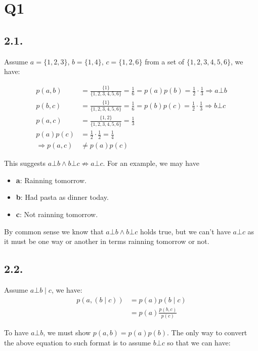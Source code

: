 \documentclass[11pt]{article}
\begin{document}
\section*{Q1}
\subsection*{2.1.}

Assume $a = \{1, 2, 3 \}$, $b = \{1, 4 \}$, $c = \{1, 2, 6 \}$ from a set of $\{1, 2, 3, 4, 5, 6\}$, we have:

\begin{align*}
    p(a, b) &= \frac{\{1\}}{\{1, 2, 3, 4, 5, 6\}} = \frac{1}{6} = p(a)p(b) = \frac{1}{2} \cdot \frac{1}{3} \Longrightarrow a \bot b \\
    p(b, c) &= \frac{\{1\}}{\{1, 2, 3, 4, 5, 6\}} = \frac{1}{6} = p(b)p(c) = \frac{1}{2} \cdot \frac{1}{3} \Longrightarrow b \bot c \\
    p(a, c) &= \frac{\{1, 2\}}{\{1, 2, 3, 4, 5, 6\}} = \frac{1}{3} \\
    p(a)p(c) &= \frac{1}{2}\cdot \frac{1}{2} = \frac{1}{4} \\
    \Longrightarrow p(a, c) &\neq p(a)p(c)
\end{align*}

This suggests $a \bot b \wedge b \bot c \not \Rightarrow a \bot c$. For an example, we may have

\begin{itemize}
    \item \textbf{a}: Rainning tomorrow.
    \item \textbf{b}: Had pasta as dinner today.
    \item \textbf{c}: Not rainning tomorrow.
\end{itemize}

By common sense we know that $a \bot b \wedge b \bot c$ holds true, but we can't have $a \bot c$ as it must be one way or another in terms rainning tomorrow or not.

\subsection*{2.2.}

Assume $a \bot b  \mid  c$, we have:
\begin{align*}
    p(a, (b  \mid  c)) &= p(a) p(b  \mid  c)\\
    &= p(a)\frac{p(b, c)}{p(c)}
\end{align*}

To have $a \bot b$, we must show $p(a, b) = p(a)p(b)$. The only way to convert the above equation to such format is to assume $b \bot c$ so that we can have:
\end{document}
